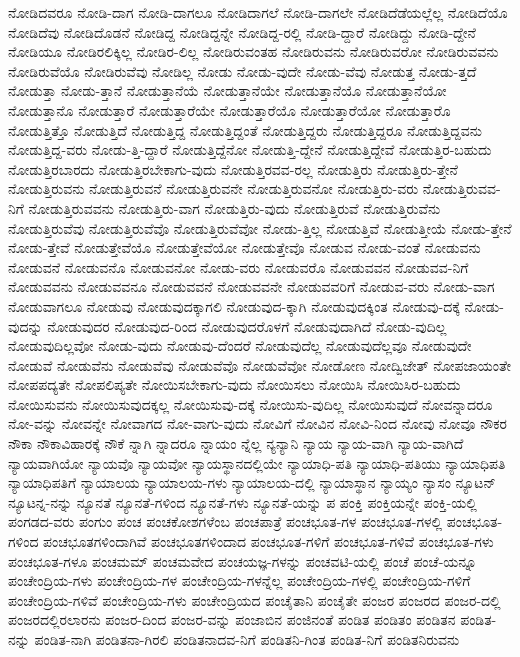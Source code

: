 {ನೋಡಿದವರೂ
ನೋಡಿ-ದಾಗ
ನೋಡಿ-ದಾಗಲೂ
ನೋಡಿದಾಗಲೆ
ನೋಡಿ-ದಾಗಲೇ
ನೋಡಿದೆಡೆಯಲ್ಲೆಲ್ಲ
ನೋಡಿದೆಯೊ
ನೋಡಿದೆವು
ನೋಡಿದೊಡನೆ
ನೋಡಿದ್ದ
ನೋಡಿದ್ದನ್ನೇ
ನೋಡಿದ್ದ-ರಲ್ಲಿ
ನೋಡಿ-ದ್ದಾರೆ
ನೋಡಿದ್ದು
ನೋಡಿ-ದ್ದೇನೆ
ನೋಡಿಯೂ
ನೋಡಿರಲಿಕ್ಕಿಲ್ಲ
ನೋಡಿರ-ಲಿಲ್ಲ
ನೋಡಿರುವಂತಹ
ನೋಡಿರುವನು
ನೋಡಿರುವರೋ
ನೋಡಿರುವವನು
ನೋಡಿರುವೆಯೊ
ನೋಡಿರುವೆವು
ನೋಡಿಲ್ಲ
ನೋಡು
ನೋಡು-ವುದೇ
ನೋಡು-ವೆವು
ನೋಡುತ್ತ
ನೋಡು-ತ್ತದೆ
ನೋಡುತ್ತಾ
ನೋಡು-ತ್ತಾನೆ
ನೋಡುತ್ತಾನೆಯೆ
ನೋಡುತ್ತಾನೆಯೇ
ನೋಡುತ್ತಾನೆಯೊ
ನೋಡುತ್ತಾನೆಯೋ
ನೋಡುತ್ತಾನೊ
ನೋಡುತ್ತಾರೆ
ನೋಡುತ್ತಾರೆಯೇ
ನೋಡುತ್ತಾರೆಯೊ
ನೋಡುತ್ತಾರೆಯೋ
ನೋಡುತ್ತಾರೊ
ನೋಡುತ್ತಿತ್ತೊ
ನೋಡುತ್ತಿದೆ
ನೋಡುತ್ತಿದ್ದ
ನೋಡುತ್ತಿದ್ದಂತೆ
ನೋಡುತ್ತಿದ್ದರು
ನೋಡುತ್ತಿದ್ದರೂ
ನೋಡುತ್ತಿದ್ದವನು
ನೋಡುತ್ತಿದ್ದ-ವರು
ನೋಡು-ತ್ತಿ-ದ್ದಾರೆ
ನೋಡುತ್ತಿದ್ದೆನೋ
ನೋಡುತ್ತಿ-ದ್ದೇನೆ
ನೋಡುತ್ತಿದ್ದೇವೆ
ನೋಡುತ್ತಿರ-ಬಹುದು
ನೋಡುತ್ತಿರಬಾರದು
ನೋಡುತ್ತಿರಬೇಕಾಗು-ವುದು
ನೋಡುತ್ತಿರವವ-ರಲ್ಲ
ನೋಡುತ್ತಿರು
ನೋಡುತ್ತಿರು-ತ್ತೇನೆ
ನೋಡುತ್ತಿರುವನು
ನೋಡುತ್ತಿರುವನೆ
ನೋಡುತ್ತಿರುವನೇ
ನೋಡುತ್ತಿರುವನೋ
ನೋಡುತ್ತಿರು-ವರು
ನೋಡುತ್ತಿರುವವ-ನಿಗೆ
ನೋಡುತ್ತಿರುವವನು
ನೋಡುತ್ತಿರು-ವಾಗ
ನೋಡುತ್ತಿರು-ವುದು
ನೋಡುತ್ತಿರುವೆ
ನೋಡುತ್ತಿರುವೆನು
ನೋಡುತ್ತಿರುವೆವು
ನೋಡುತ್ತಿರುವೆವೊ
ನೋಡುತ್ತಿರುವೆವೋ
ನೋಡು-ತ್ತಿಲ್ಲ
ನೋಡುತ್ತಿವೆ
ನೋಡುತ್ತೀಯೆ
ನೋಡು-ತ್ತೇನೆ
ನೋಡು-ತ್ತೇವೆ
ನೋಡುತ್ತೇವೆಯೊ
ನೋಡುತ್ತೇವೆಯೋ
ನೋಡುತ್ತೇವೊ
ನೋಡುವ
ನೋಡು-ವಂತೆ
ನೋಡುವನು
ನೋಡುವನೆ
ನೋಡುವನೊ
ನೋಡುವನೋ
ನೋಡು-ವರು
ನೋಡುವರೊ
ನೋಡುವವನ
ನೋಡುವವ-ನಿಗೆ
ನೋಡುವವನು
ನೋಡುವವನೂ
ನೋಡುವವನೆ
ನೋಡುವವನೇ
ನೋಡುವವರಿಗೆ
ನೋಡುವ-ವರು
ನೋಡು-ವಾಗ
ನೋಡುವಾಗಲೂ
ನೋಡುವು
ನೋಡುವುದಕ್ಕಾಗಲಿ
ನೋಡುವುದ-ಕ್ಕಾಗಿ
ನೋಡುವುದಕ್ಕಿಂತ
ನೋಡುವು-ದಕ್ಕೆ
ನೋಡು-ವುದನ್ನು
ನೋಡುವುದರ
ನೋಡುವುದ-ರಿಂದ
ನೋಡುವುದರೊಳಗೆ
ನೋಡುವುದಾಗಿದೆ
ನೋಡು-ವುದಿಲ್ಲ
ನೋಡುವುದಿಲ್ಲವೋ
ನೋಡು-ವುದು
ನೋಡುವು-ದೆಂದರೆ
ನೋಡುವುದೆಲ್ಲ
ನೋಡುವುದೆಲ್ಲವೂ
ನೋಡುವುದೇ
ನೋಡುವೆ
ನೋಡುವೆನು
ನೋಡುವೆವು
ನೋಡುವೆವೊ
ನೋಡುವೆವೋ
ನೋಡೋಣ
ನೋದ್ವಿಜೇತ್
ನೋಪಜಾಯಂತೇ
ನೋಪಪದ್ಯತೇ
ನೋಪಲಿಪ್ಯತೇ
ನೋಯಿಸಬೇಕಾಗು-ವುದು
ನೋಯಿಸಲು
ನೋಯಿಸಿ
ನೋಯಿಸಿರ-ಬಹುದು
ನೋಯಿಸುವನು
ನೋಯಿಸುವುದಕ್ಕಲ್ಲ
ನೋಯಿಸುವು-ದಕ್ಕೆ
ನೋಯಿಸು-ವುದಿಲ್ಲ
ನೋಯಿಸುವುದೆ
ನೋವನ್ನಾದರೂ
ನೋ-ವನ್ನು
ನೋವನ್ನೇ
ನೋವಾಗದ
ನೋ-ವಾಗು-ವುದು
ನೋವಿಗೆ
ನೋವಿನ
ನೋವಿ-ನಿಂದ
ನೋವು
ನೋವೂ
ನೌಕರ
ನೌಕಾ
ನೌಕಾವಿಹಾರಕ್ಕೆ
ನೌಕೆ
ನ್ನಾಗಿ
ನ್ನಾದರೂ
ನ್ನಾಯಂ
ನ್ನೆಲ್ಲ
ನ್ಯನ್ಯಾನಿ
ನ್ಯಾಯ
ನ್ಯಾಯ-ವಾಗಿ
ನ್ಯಾಯ-ವಾಗಿದೆ
ನ್ಯಾಯವಾಗಿಯೋ
ನ್ಯಾಯವೊ
ನ್ಯಾಯವೋ
ನ್ಯಾಯಸ್ಥಾನದಲ್ಲಿಯೇ
ನ್ಯಾಯಾಧಿ-ಪತಿ
ನ್ಯಾಯಾಧಿ-ಪತಿಯು
ನ್ಯಾಯಾಧಿಪತಿ
ನ್ಯಾಯಾಧಿಪತಿಗೆ
ನ್ಯಾಯಾಲಯ
ನ್ಯಾಯಾಲಯ-ಗಳು
ನ್ಯಾಯಾಲಯ-ದಲ್ಲಿ
ನ್ಯಾಯಾಸ್ಥಾನ
ನ್ಯಾಯ್ಯಂ
ನ್ಯಾಸಂ
ನ್ಯೂಟನ್
ನ್ಯೂಟನ್ನ-ನನ್ನು
ನ್ಯೂನತೆ
ನ್ಯೂನತೆ-ಗಳಿಂದ
ನ್ಯೂನತೆ-ಗಳು
ನ್ಯೂನತೆ-ಯನ್ನು
ಪ
ಪಂಕ್ತಿ
ಪಂಕ್ತಿಯನ್ನೇ
ಪಂಕ್ತಿ-ಯಲ್ಲಿ
ಪಂಗಡದ-ವರು
ಪಂಗುಂ
ಪಂಚ
ಪಂಚಕೋಶಗಳೆಂಬ
ಪಂಚಪಾತ್ರೆ
ಪಂಚಭೂತ-ಗಳ
ಪಂಚಭೂತ-ಗಳಲ್ಲಿ
ಪಂಚಭೂತ-ಗಳಿಂದ
ಪಂಚಭೂತಗಳಿಂದಾಗಿವೆ
ಪಂಚಭೂತಗಳಿಂದಾದ
ಪಂಚಭೂತ-ಗಳಿಗೆ
ಪಂಚಭೂತ-ಗಳಿವೆ
ಪಂಚಭೂತ-ಗಳು
ಪಂಚಭೂತ-ಗಳೂ
ಪಂಚಮಮ್
ಪಂಚಮವೇದ
ಪಂಚಯಜ್ಞ-ಗಳನ್ನು
ಪಂಚವಟಿ-ಯಲ್ಲಿ
ಪಂಚೆ
ಪಂಚೆ-ಯನ್ನೂ
ಪಂಚೇಂದ್ರಿಯ-ಗಳು
ಪಂಚೇಂದ್ರಿಯ-ಗಳ
ಪಂಚೇಂದ್ರಿಯ-ಗಳನ್ನೆಲ್ಲ
ಪಂಚೇಂದ್ರಿಯ-ಗಳಲ್ಲಿ
ಪಂಚೇಂದ್ರಿಯ-ಗಳಿಗೆ
ಪಂಚೇಂದ್ರಿಯ-ಗಳಿವೆ
ಪಂಚೇಂದ್ರಿಯ-ಗಳು
ಪಂಚೇಂದ್ರಿಯದ
ಪಂಚೈತಾನಿ
ಪಂಚೈತೇ
ಪಂಜರ
ಪಂಜರದ
ಪಂಜರ-ದಲ್ಲಿ
ಪಂಜರದಲ್ಲಿರಲಾರನು
ಪಂಜರ-ದಿಂದ
ಪಂಜರ-ವನ್ನು
ಪಂಜಾಬಿನ
ಪಂಜಿನಂತೆ
ಪಂಡಿತ
ಪಂಡಿತಂ
ಪಂಡಿತನ
ಪಂಡಿತ-ನನ್ನು
ಪಂಡಿತ-ನಾಗಿ
ಪಂಡಿತನಾ-ಗಿರಲಿ
ಪಂಡಿತನಾದವ-ನಿಗೆ
ಪಂಡಿತನಿ-ಗಿಂತ
ಪಂಡಿತ-ನಿಗೆ
ಪಂಡಿತನಿರುವನು
}
